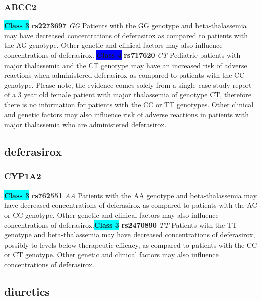 \documentclass{book}
\begin{document}
\subsubsection{ ABCC2 }

\begin{center}
\textbf{\colorbox{cyan} {Class 3}} \textbf{ rs2273697 } \textit{ GG }
Patients with the GG genotype and beta-thalassemia may have decreased concentrations of deferasirox as compared to patients with the AG genotype. Other genetic and clinical factors may also influence concentrations of deferasirox.
\textbf{\colorbox{blue} {Class 4}} \textbf{ rs717620 } \textit{ CT }
Pediatric patients with major thalassemia and the CT genotype may have an increased risk of adverse reactions when administered deferasirox as compared to patients with the CC genotype. Please note, the evidence comes solely from a single case study report of a 3 year old female patient with major thalassemia of genotype CT, therefore there is no information for patients with the CC or TT genotypes. Other clinical and genetic factors may also influence risk of adverse reactions in patients with major thalassemia who are administered deferasirox.

\end{center}\subsection{ deferasirox }


\subsubsection{ CYP1A2 }

\begin{center}
\textbf{\colorbox{cyan} {Class 3}} \textbf{ rs762551 } \textit{ AA }
Patients with the AA genotype and beta-thalassemia may have decreased concentrations of deferasirox as compared to patients with the AC or CC genotype. Other genetic and clinical factors may also influence concentrations of deferasirox.\textbf{\colorbox{cyan} {Class 3}} \textbf{ rs2470890 } \textit{ TT }
Patients with the TT genotype and beta-thalassemia may have decreased concentrations of deferasirox, possibly to levels below therapeutic efficacy, as compared to patients with the CC or CT genotype. Other genetic and clinical factors may also influence concentrations of deferasirox.


\end{center}\subsection{ diuretics }
\end{document}
